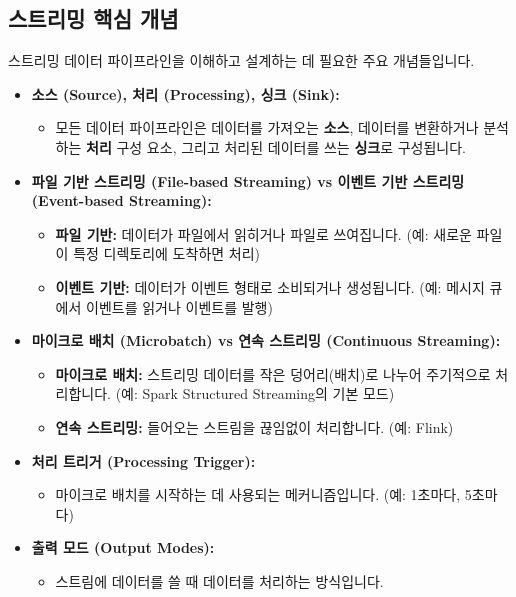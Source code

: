 \documentclass[11pt,a4paper]{article}
\begin{document}
\subsection{스트리밍 핵심 개념}

스트리밍 데이터 파이프라인을 이해하고 설계하는 데 필요한 주요 개념들입니다.

\begin{itemize}
    \item \textbf{소스 (Source), 처리 (Processing), 싱크 (Sink):}
    \begin{itemize}
        \item 모든 데이터 파이프라인은 데이터를 가져오는 \textbf{소스}, 데이터를 변환하거나 분석하는 \textbf{처리} 구성 요소, 그리고 처리된 데이터를 쓰는 \textbf{싱크}로 구성됩니다.
    \end{itemize}
    \item \textbf{파일 기반 스트리밍 (File-based Streaming) vs 이벤트 기반 스트리밍 (Event-based Streaming):}
    \begin{itemize}
        \item \textbf{파일 기반:} 데이터가 파일에서 읽히거나 파일로 쓰여집니다. (예: 새로운 파일이 특정 디렉토리에 도착하면 처리)
        \item \textbf{이벤트 기반:} 데이터가 이벤트 형태로 소비되거나 생성됩니다. (예: 메시지 큐에서 이벤트를 읽거나 이벤트를 발행)
    \end{itemize}
    \item \textbf{마이크로 배치 (Microbatch) vs 연속 스트리밍 (Continuous Streaming):}
    \begin{itemize}
        \item \textbf{마이크로 배치:} 스트리밍 데이터를 작은 덩어리(배치)로 나누어 주기적으로 처리합니다. (예: Spark Structured Streaming의 기본 모드)
        \item \textbf{연속 스트리밍:} 들어오는 스트림을 끊임없이 처리합니다. (예: Flink)
    \end{itemize}
    \item \textbf{처리 트리거 (Processing Trigger):}
    \begin{itemize}
        \item 마이크로 배치를 시작하는 데 사용되는 메커니즘입니다. (예: 1초마다, 5초마다)
    \end{itemize}
    \item \textbf{출력 모드 (Output Modes):}
    \begin{itemize}
        \item 스트림에 데이터를 쓸 때 데이터를 처리하는 방식입니다.

\end{itemize}
\end{itemize}
\end{document}
